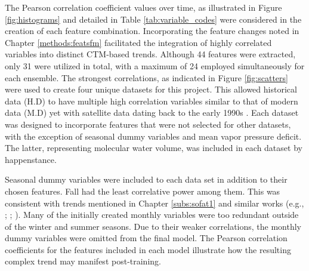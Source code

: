The Pearson correlation coefficient values over time, as illustrated in Figure \ref{fig:histograms} and detailed in Table \ref{tab:variable_codes} were considered in the creation of each feature combination. Incorporating the feature changes noted in Chapter \ref{methods:featsfm} facilitated the integration of highly correlated variables into distinct CTM-based trends.  Although 44 features were extracted, only 31 were utilized in total, with a maximum of 24 employed simultaneously for each ensemble. The strongest correlations, as indicated in Figure \ref{fig:scatters} were used to create four unique datasets for this project. This allowed historical data (H.D) to have multiple high correlation variables similar to that of modern data (M.D) yet with satellite data dating back to the early 1990s \parencite{hersbach2020}. Each dataset was designed to incorporate features that were not selected for other datasets, with the exception of seasonal dummy variables and mean vapor pressure deficit. The latter, representing molecular water volume, was included in each dataset by happenstance.

Seasonal dummy variables were included to each data set in addition to their chosen features. Fall had the least correlative power among them. This was consistent with trends mentioned in Chapter \ref{subs:sofat1} and similar works (e.g., \cite{li_large_2021}; \cite{seroji_ground_2016}; \cite{zhao_assessing_2016}). Many of the initially created monthly variables were too redundant outside of the winter and summer seasons. Due to their weaker correlations, the monthly dummy variables were omitted from the final model. The Pearson correlation coefficients for the features included in each model illustrate how the resulting complex trend may manifest post-training.
